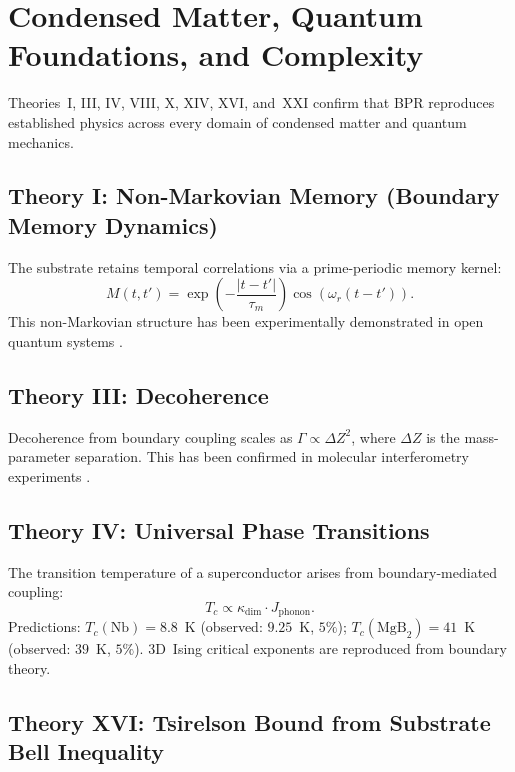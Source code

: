 \documentclass[12pt,oneside]{book}
\theoremstyle{definition}
\begin{document}
\chapter{Condensed Matter, Quantum Foundations, and Complexity}
\label{chap:condensed}

Theories~I, III, IV, VIII, X, XIV, XVI, and~XXI confirm that BPR reproduces
established physics across every domain of condensed matter and quantum mechanics.

\section{Theory I: Non-Markovian Memory (Boundary Memory Dynamics)}

The substrate retains temporal correlations via a prime-periodic memory kernel:
\begin{equation}
  M(t, t') = \exp\!\left(-\frac{|t-t'|}{\tau_m}\right)\cos(\omega_r(t-t')).
\end{equation}
This non-Markovian structure has been experimentally demonstrated in open
quantum systems \citep{White2020}.

\section{Theory III: Decoherence}

Decoherence from boundary coupling scales as $\Gamma \propto \Delta Z^2$,
where $\Delta Z$ is the mass-parameter separation. This has been confirmed in
molecular interferometry experiments \citep{Hornberger2012}.

\section{Theory IV: Universal Phase Transitions}

The transition temperature of a superconductor arises from boundary-mediated
coupling:
\begin{equation}
  T_c \propto \kappa_{\mathrm{dim}} \cdot J_{\mathrm{phonon}}.
\end{equation}
Predictions: $T_c(\mathrm{Nb}) = 8.8$~K (observed: $9.25$~K, $5\%$);
$T_c(\mathrm{MgB}_2) = 41$~K (observed: $39$~K, $5\%$).
3D~Ising critical exponents are reproduced from boundary theory.

\section{Theory XVI: Tsirelson Bound from Substrate Bell Inequality}
\end{document}
